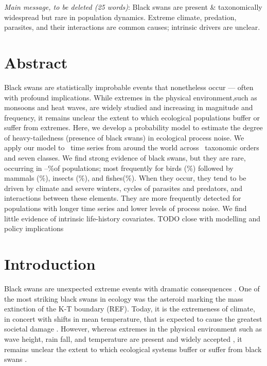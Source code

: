 
\noindent
\emph{Main message, to be deleted (25 words)}: Black swans are present \&
taxonomically widespread but rare in population dynamics. Extreme climate,
predation, parasites, and their interactions are common causes; intrinsic
drivers are unclear.

\section{Abstract}

Black swans are statistically improbable events that nonetheless occur ---
often with profound implications. While extremes in the physical
environment,such as monsoons and heat waves, are widely studied and increasing
in magnitude and frequency, it remains unclear the extent to which ecological
populations buffer or suffer from extremes. Here, we develop a probability
model to estimate the degree of heavy-tailedness (presence of black swans) in
ecological process noise. We apply our model to \NPops~time series from around
the world across \NOrders~taxonomic orders and seven classes. We find strong
evidence of black swans, but they are rare, occurring in
\overallMinPerc--\overallMaxPerc\%of populations; most frequently for birds
(\AvesRangePerc\%) followed by mammals (\MammaliaRangePerc\%), insects
(\InsectaRangePerc\%), and fishes(\OsteichthyesRangePerc\%). When they occur,
they tend to be driven by climate and severe winters, cycles of parasites and
predators, and interactions between these elements. They are more frequently
detected for populations with longer time series and lower levels of process
noise. We find little evidence of intrinsic life-history covariates. TODO close
with modelling and policy implications

\section{Introduction}

Black swans are unexpected extreme events with dramatic consequences
\citep{taleb2007,sornette2009}. One of the most striking black swans in ecology
was the asteroid marking the mass extinction of the K-T boundary (REF). Today,
it is the extremeness of climate, in concert with shifts in mean temperature,
that is expected to cause the greatest societal damage \citep{ipcc2012}.
However, whereas extremes in the physical environment such as wave height, rain
fall, and temperature are present and widely accepted
\citep{gaines1993,katz2005}, it remains unclear the extent to which ecological
systems buffer or suffer from black swans \citep{nunez2012}.

